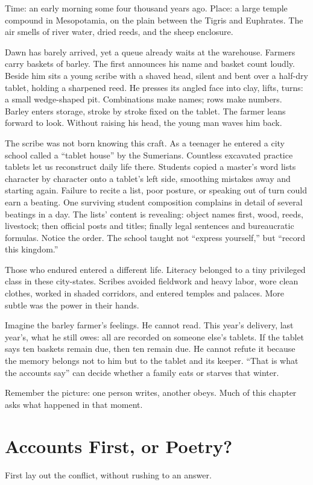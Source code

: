 Time: an early morning some four thousand years ago. Place: a large temple compound in Mesopotamia, on the plain between the Tigris and Euphrates. The air smells of river water, dried reeds, and the sheep enclosure.

Dawn has barely arrived, yet a queue already waits at the warehouse. Farmers carry baskets of barley. The first announces his name and basket count loudly. Beside him sits a young scribe with a shaved head, silent and bent over a half-dry tablet, holding a sharpened reed. He presses its angled face into clay, lifts, turns: a small wedge-shaped pit. Combinations make names; rows make numbers. Barley enters storage, stroke by stroke fixed on the tablet. The farmer leans forward to look. Without raising his head, the young man waves him back.

The scribe was not born knowing this craft. As a teenager he entered a city school called a ``tablet house'' by the Sumerians. Countless excavated practice tablets let us reconstruct daily life there. Students copied a master's word lists character by character onto a tablet's left side, smoothing mistakes away and starting again. Failure to recite a list, poor posture, or speaking out of turn could earn a beating. One surviving student composition complains in detail of several beatings in a day. The lists' content is revealing: object names first, wood, reeds, livestock; then official posts and titles; finally legal sentences and bureaucratic formulas. Notice the order. The school taught not ``express yourself,'' but ``record this kingdom.''

Those who endured entered a different life. Literacy belonged to a tiny privileged class in these city-states. Scribes avoided fieldwork and heavy labor, wore clean clothes, worked in shaded corridors, and entered temples and palaces. More subtle was the power in their hands.

Imagine the barley farmer's feelings. He cannot read. This year's delivery, last year's, what he still owes: all are recorded on someone else's tablets. If the tablet says ten baskets remain due, then ten remain due. He cannot refute it because the memory belongs not to him but to the tablet and its keeper. ``That is what the accounts say'' can decide whether a family eats or starves that winter.

Remember the picture: one person writes, another obeys. Much of this chapter asks what happened in that moment.

\section{Accounts First, or Poetry?}
First lay out the conflict, without rushing to an answer.

